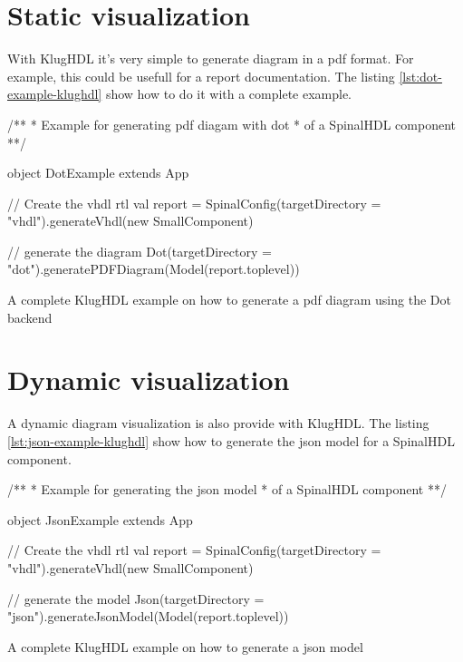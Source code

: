 \section{Static visualization}
\label{sec:static-visualization}

With KlugHDL it's very simple to generate diagram in a pdf format. For example, this could be
usefull for a report documentation. The listing \ref{lst:dot-example-klughdl}
show how to do it with a complete example.

\begin{listing}[H]
  \centering
  \begin{scalacode}
  /**
   * Example for generating pdf diagam with dot
   * of a SpinalHDL component
  **/
   
   object DotExample extends App {

    // Create the vhdl rtl
    val report = SpinalConfig(targetDirectory = "vhdl").generateVhdl(new SmallComponent)

    // generate the diagram
    Dot(targetDirectory = "dot").generatePDFDiagram(Model(report.toplevel))
  }
  \end{scalacode}
  \caption[KlugHDL example on how to generate a pdf diagram]{A complete KlugHDL
    example on how to generate a pdf diagram using the Dot backend}
  \label{lst:dot-example-klughdl}
\end{listing}

\section{Dynamic visualization}
\label{sec:dynamic-visualization}

A dynamic diagram visualization is also provide with KlugHDL. The listing
\ref{lst:json-example-klughdl} show how to generate the json model for a
SpinalHDL component.

\begin{listing}[H]
  \centering
  \begin{scalacode}
  /**
   * Example for generating the json model
   * of a SpinalHDL component
   **/

   object JsonExample extends App {
     
     // Create the vhdl rtl
     val report = SpinalConfig(targetDirectory = "vhdl").generateVhdl(new SmallComponent)

     // generate the model
     Json(targetDirectory = "json").generateJsonModel(Model(report.toplevel))
   }
  \end{scalacode}
  \caption[KlugHDL example on how to generate a json model]{A complete KlugHDL
    example on how to generate a json model}
  \label{lst:json-example-klughdl}
\end{listing}

